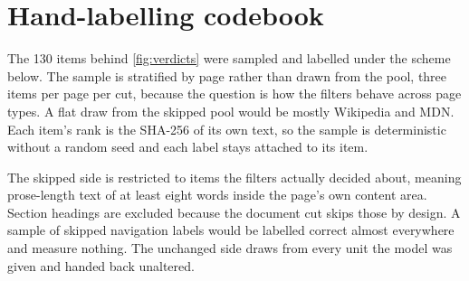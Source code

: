 \begin{table}[htbp]
\begin{tabular}{@{}l rrrr rrrr@{}}
		\bottomrule
	\end{tabular}
\end{table}

\section{Hand-labelling codebook}
\label{app:codebook}

The \num{130} items behind \cref{fig:verdicts} were sampled and labelled under the scheme below.
The sample is stratified by page rather than drawn from the pool, three items per page per cut, because the question is how the filters behave across page types.
A flat draw from the skipped pool would be mostly Wikipedia and MDN.
Each item's rank is the SHA-256 of its own text, so the sample is deterministic without a random seed and each label stays attached to its item.

The skipped side is restricted to items the filters actually decided about, meaning prose-length text of at least eight words inside the page's own content area.
Section headings are excluded because the document cut skips those by design.
A sample of skipped navigation labels would be labelled correct almost everywhere and measure nothing.
The unchanged side draws from every unit the model was given and handed back unaltered.


